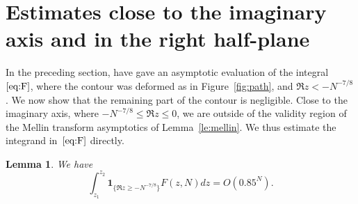 \documentclass[a4paper]{amsart}
\newtheorem{lemma}[theorem]{Lemma}
\begin{document}
\section{Estimates close to the imaginary axis and in the right
half-plane}\label{se:right}

In the preceding section, have gave an asymptotic evaluation of the
integral~$\eqref{eq:F}$, where the contour was deformed as in 
Figure~\ref{fig:path}, and $\Re z < -N^{-7/8}$. We now show that
the remaining part of the contour is negligible.
Close to the imaginary axis, where $-N^{-7/8} \leq \Re z \leq 0$,
we are outside of the validity region of the Mellin transform asymptotics
of Lemma~\ref{le:mellin}. We thus estimate the integrand
in~$\eqref{eq:F}$ directly.
%
\begin{lemma}\label{le:iR}
  We have
  \[
    \int_{z_1}^{z_2} \mathbf{1}_{\{\Re z \geq -N^{-7/8}\}}F(z,N) dz = O(0.85^N).
  \]
\end{lemma}
\end{document}

